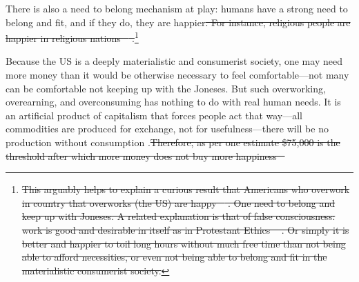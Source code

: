 \documentclass[10pt, letterpaper]{article}
\providecommand{\DIFaddtex}[1]{{\protect\color{blue}\uwave{#1}}} %
\providecommand{\DIFdeltex}[1]{{\protect\color{red}\sout{#1}}}                      %
\providecommand{\DIFaddbegin}{} %
\providecommand{\DIFaddend}{} %
\providecommand{\DIFdelbegin}{} %
\providecommand{\DIFdelend}{} %
\providecommand{\DIFadd}[1]{\texorpdfstring{\DIFaddtex{#1}}{#1}} %
\providecommand{\DIFdel}[1]{\texorpdfstring{\DIFdeltex{#1}}{}} %
\newcommand{\DIFscaledelfig}{0.5}
\newlength{\DIFdelgraphicswidth} %
\newlength{\DIFdelgraphicsheight} %
\newcommand{\DIFaddincludegraphics}[2][]{{\color{blue}\fbox{\DIFOincludegraphics[#1]{#2}}}} %
\newcommand{\DIFdelincludegraphics}[2][]{%
\sbox{\DIFdelgraphicsbox}{\DIFOincludegraphics[#1]{#2}}%
\settoboxwidth{\DIFdelgraphicswidth}{\DIFdelgraphicsbox} %
\settoboxtotalheight{\DIFdelgraphicsheight}{\DIFdelgraphicsbox} %
\scalebox{\DIFscaledelfig}{%
\parbox[b]{\DIFdelgraphicswidth}{\usebox{\DIFdelgraphicsbox}\\[-\baselineskip] \rule{\DIFdelgraphicswidth}{0em}}\llap{\resizebox{\DIFdelgraphicswidth}{\DIFdelgraphicsheight}{%
\setlength{\unitlength}{\DIFdelgraphicswidth}%
\begin{picture}(1,1)%
\thicklines\linethickness{2pt} %
{\color[rgb]{1,0,0}\put(0,0){\framebox(1,1){}}}%
{\color[rgb]{1,0,0}\put(0,0){\line( 1,1){1}}}%
{\color[rgb]{1,0,0}\put(0,1){\line(1,-1){1}}}%
\end{picture}%
}\hspace*{3pt}}} %
} %
\DeclareRobustCommand{\DIFaddbegin}{\DIFOaddbegin \let\includegraphics\DIFaddincludegraphics} %
\DeclareRobustCommand{\DIFaddend}{\DIFOaddend \let\includegraphics\DIFOincludegraphics} %
\DeclareRobustCommand{\DIFdelbegin}{\DIFOdelbegin \let\includegraphics\DIFdelincludegraphics} %
\DeclareRobustCommand{\DIFdelend}{\DIFOaddend \let\includegraphics\DIFOincludegraphics} %
\begin{document}
\begin{spacing}{1.8}
There is also a need to belong mechanism at play: humans have a strong need to
belong and fit, and if they do, they are happier\DIFdelbegin \DIFdel{. For instance, religious people are happier in religious nations
\mbox{%
\citep{aokrel}}\hspace{0pt}%
.}\footnote{\DIFdel{This arguably helps to explain a curious result that
  Americans who overwork in country that overworks (the US) are happy
  \mbox{%
\citep{aokditella}}\hspace{0pt}%
. One need to belong and keep up with Joneses. A related
  explanation is that of false consciousness: work is good and desirable in
  itself as in Protestant Ethics \mbox{%
\citep{weber03}}\hspace{0pt}%
. Or simply it is better and
  happier to toil long hours without much free time than not being able to
  afford necessities, or even not being able to belong and fit in the
  materialistic consumerist society.}}
\addtocounter{footnote}{-1}%
\DIFdelend %
 \DIFaddbegin \DIFadd{\mbox{%
\citep{aokrel,aokditella} }\hspace{0pt}%
}\DIFaddend Because the US is a deeply materialistic and consumerist society, one may need more money than it would be otherwise necessary to feel comfortable---not
many can be comfortable not keeping up with the Joneses. But such overworking, overearning, and overconsuming has nothing to do with real human needs. It is an artificial
product of capitalism that forces people act that way---all commodities are
produced for exchange, not for usefulness---there will be no production without
consumption \citep{marx1844-human-requirements}.\DIFdelbegin \DIFdel{Therefore, as per one estimate
\$75,000 is the threshold after which more money does not buy more happiness
\mbox{%
\citep{kahneman10}}\hspace{0pt}%
}
\end{spacing}
\end{document}
